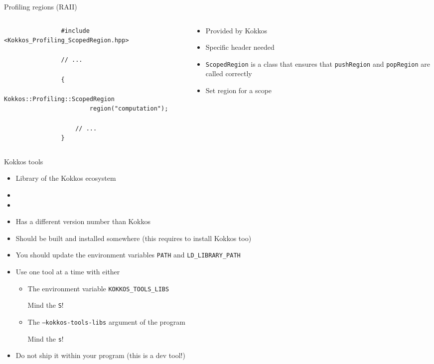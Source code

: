 \documentclass[
    aspectratio=169,
    \createHandout
]{beamer}
\begin{document}
\begin{frame}[fragile]{Profiling regions (RAII)}
    \begin{columns}
        \begin{column}{0.65\linewidth}
            \begin{verbatim}
                #include <Kokkos_Profiling_ScopedRegion.hpp>

                // ...

                {
                    Kokkos::Profiling::ScopedRegion
                        region("computation");

                    // ...
                }
            \end{verbatim}
        \end{column}
        \begin{column}{0.35\linewidth}
            \begin{itemize}
                \item Provided by Kokkos
                \item Specific header needed
                \item \texttt{ScopedRegion} is a class that ensures that \texttt{pushRegion} and \texttt{popRegion} are called correctly
                \item Set region for a scope
            \end{itemize}
        \end{column}
    \end{columns}
\end{frame}

\begin{frame}{Kokkos tools}
    \begin{itemize}
        \item Library of the Kokkos ecosystem
        \item {}
        \item {}
        \item Has a different version number than Kokkos
        \item Should be built and installed somewhere (this requires to install Kokkos too)
        \item You should update the environment variables \texttt{PATH} and \texttt{LD\_LIBRARY\_PATH}
        \item Use one tool at a time with either
        \begin{itemize}
            \item The environment variable \texttt{KOKKOS\_TOOLS\_LIBS}

            Mind the \texttt{S}!
            \item The \texttt{--kokkos-tools-libs} argument of the program

            Mind the \texttt{s}!
        \end{itemize}
        \item Do not ship it within your program (this is a dev tool!)
    \end{itemize}
\end{frame}
\end{document}
